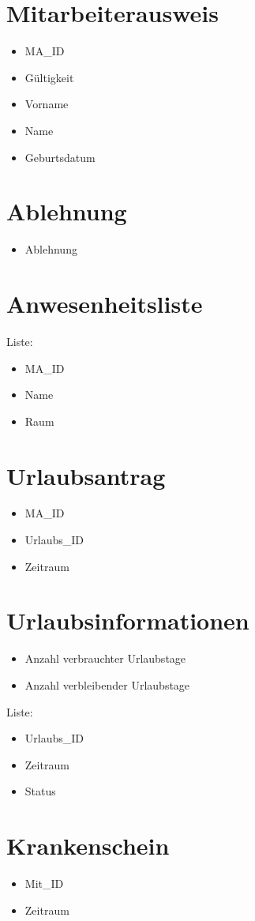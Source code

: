 \section{Mitarbeiterausweis}
\begin{itemize}
\item MA\_ID
\item Gültigkeit
\item Vorname
\item Name
\item Geburtsdatum
\end{itemize}
\section{Ablehnung}
\begin{itemize}
\item Ablehnung
\end{itemize}
\section{Anwesenheitsliste}
Liste: 
\begin{itemize}
\item MA\_ID
\item Name
\item Raum
\end{itemize}
\section{Urlaubsantrag}
\begin{itemize}
\item MA\_ID
\item Urlaubs\_ID
\item Zeitraum
\end{itemize}
\section{Urlaubsinformationen}
\begin{itemize}
\item Anzahl verbrauchter Urlaubstage
\item Anzahl verbleibender Urlaubstage
\end{itemize}
Liste: 
\begin{itemize}
\item Urlaubs\_ID
\item Zeitraum
\item Status
\end{itemize}
\section{Krankenschein}
\begin{itemize}
\item Mit\_ID
\item Zeitraum
\end{itemize}
